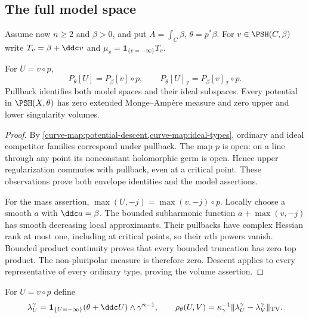 \subsection{The full model space}

Assume now $n\geq2$ and $\beta>0$, and put $A=\int_C\beta$,
$\theta=p^*\beta$. For $v\in\PSH(C,\beta)$ write
$T_v=\beta+\ddc v$ and $\mu_v=\mathbf1_{\{v=-\infty\}}T_v$.

\begin{lemma}\label{curve-map:model-envelopes}
For $U=v\circ p$,
\[
 P_\theta[U]=P_\beta[v]\circ p,\qquad
 P_\theta[U]_{\mathcal I}=P_\beta[v]_{\mathcal I}\circ p.
\]
Pullback identifies both model spaces and their ideal subspaces.
Every potential in $\PSH(X,\theta)$ has zero extended
Monge--Amp\`ere measure and zero upper and lower singularity volumes.
\end{lemma}
\begin{proof}
By \cref{curve-map:potential-descent,curve-map:ideal-types},
ordinary and ideal competitor families correspond under pullback.
The map $p$ is open: on a line through any point its nonconstant
holomorphic germ is open. Hence upper regularization commutes
with pullback, even at a critical point. These observations
prove both envelope identities and the model assertions.

For the mass assertion, $\max(U,-j)=\max(v,-j)\circ p$. Locally
choose a smooth $a$ with $\ddc a=\beta$. The bounded subharmonic
function $a+\max(v,-j)$ has smooth decreasing local approximants.
Their pullbacks have complex Hessian rank at most one, including
at critical points, so their $n$th powers vanish. Bounded product
continuity proves that every bounded truncation has zero top
product. The non-pluripolar measure is therefore zero. Descent
applies to every representative of every ordinary type, proving
the volume assertion.
\end{proof}

For $U=v\circ p$ define
\[
 \lambda_U^\gamma
  =\mathbf1_{\{U=-\infty\}}(\theta+\ddc U)\wedge\gamma^{n-1},
 \qquad
 \rho_\theta(U,V)=\kappa_\gamma^{-1}
       \|\lambda_U^\gamma-\lambda_V^\gamma\|_{\mathrm{TV}}.
\]

